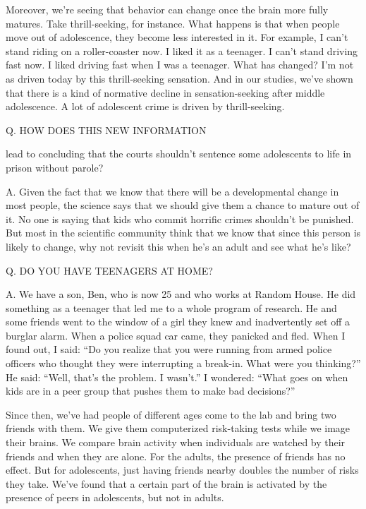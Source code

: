 ﻿\documentclass[12pt]{article}
\begin{document}
Moreover, we're seeing that behavior can change once the brain more fully matures. Take
thrill-seeking, for instance. What happens is that when people move out of adolescence, they become
less interested in it. For example, I can't stand riding on a roller-coaster now. I liked it as a
teenager. I can't stand driving fast now. I liked driving fast when I was a teenager. What has
changed? I'm not as driven today by this thrill-seeking sensation. And in our studies, we've shown
that there is a kind of normative decline in sensation-seeking after middle adolescence. A lot of
adolescent crime is driven by thrill-seeking.

Q. HOW DOES THIS NEW INFORMATION

lead to concluding that the courts shouldn't sentence some adolescents to life in prison without
parole?

A. Given the fact that we know that there will be a developmental change in most people, the science
says that we should give them a chance to mature out of it. No one is saying that kids who commit
horrific crimes shouldn't be punished. But most in the scientific community think that we know that
since this person is likely to change, why not revisit this when he's an adult and see what he's
like?

Q. DO YOU HAVE TEENAGERS AT HOME?

A. We have a son, Ben, who is now 25 and who works at Random House. He did something as a teenager
that led me to a whole program of research. He and some friends went to the window of a girl they
knew and inadvertently set off a burglar alarm. When a police squad car came, they panicked and
fled. When I found out, I said: ``Do you realize that you were running from armed police officers
who thought they were interrupting a break-in. What were you thinking?'' He said: ``Well, that's the
problem. I wasn't.'' I wondered: ``What goes on when kids are in a peer group that pushes them to
make bad decisions?''

Since then, we've had people of different ages come to the lab and bring two friends with them. We
give them computerized risk-taking tests while we image their brains. We compare brain activity when
individuals are watched by their friends and when they are alone. For the adults, the presence of
friends has no effect. But for adolescents, just having friends nearby doubles the number of risks
they take. We've found that a certain part of the brain is activated by the presence of peers in
adolescents, but not in adults.
\end{document}
